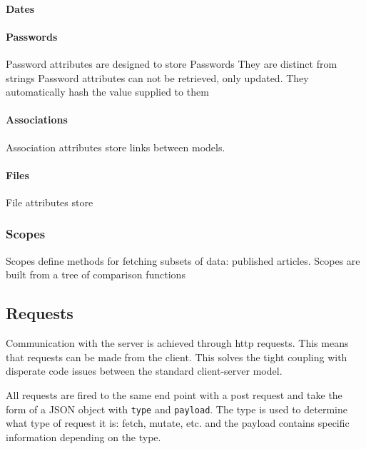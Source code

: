 \documentclass[
  12pt,
]{article}
\newcommand{\passthrough}[1]{#1}
\let\oldparagraph\paragraph
\renewcommand{\paragraph}[1]{\oldparagraph{#1}\mbox{}}
\begin{document}
\hypertarget{dates}{%
\paragraph{Dates}\label{dates}}

\hypertarget{passwords}{%
\paragraph{Passwords}\label{passwords}}

Password attributes are designed to store Passwords They are distinct
from strings Password attributes can not be retrieved, only updated.
They automatically hash the value supplied to them

\hypertarget{associations}{%
\paragraph{Associations}\label{associations}}

Association attributes store links between models.

\hypertarget{files}{%
\paragraph{Files}\label{files}}

File attributes store

\hypertarget{scopes}{%
\subsubsection{Scopes}\label{scopes}}

Scopes define methods for fetching subsets of data: published articles.
Scopes are built from a tree of comparison functions

\hypertarget{requests}{%
\subsection{Requests}\label{requests}}

Communication with the server is achieved through http requests. This
means that requests can be made from the client. This solves the tight
coupling with disperate code issues between the standard client-server
model.

All requests are fired to the same end point with a post request and
take the form of a JSON object with \passthrough{\lstinline!type!} and
\passthrough{\lstinline!payload!}. The type is used to determine what
type of request it is: fetch, mutate, etc. and the payload contains
specific information depending on the type.
\end{document}
